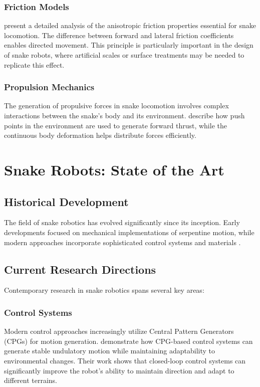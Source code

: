 \documentclass[12pt,a4paper]{report}
\begin{document}
\subsubsection{Friction Models}
\textcite{liljeback-2013} present a detailed analysis of the anisotropic friction properties essential for snake locomotion. The difference between forward and lateral friction coefficients enables directed movement. This principle is particularly important in the design of snake robots, where artificial scales or surface treatments may be needed to replicate this effect.

\subsubsection{Propulsion Mechanics}
The generation of propulsive forces in snake locomotion involves complex interactions between the snake's body and its environment. \textcite{transeth-2009} describe how push points in the environment are used to generate forward thrust, while the continuous body deformation helps distribute forces efficiently.

\section{Snake Robots: State of the Art}

\subsection{Historical Development}
The field of snake robotics has evolved significantly since its inception. Early developments focused on mechanical implementations of serpentine motion, while modern approaches incorporate sophisticated control systems and materials \parencite{wang-2016}.

\subsection{Current Research Directions}
Contemporary research in snake robotics spans several key areas:

\subsubsection{Control Systems}
Modern control approaches increasingly utilize Central Pattern Generators (CPGs) for motion generation. \textcite{wang2020cpg} demonstrate how CPG-based control systems can generate stable undulatory motion while maintaining adaptability to environmental changes. Their work shows that closed-loop control systems can significantly improve the robot's ability to maintain direction and adapt to different terrains.
\end{document}
